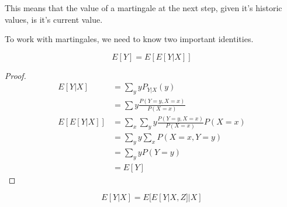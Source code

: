 \documentclass[12pt,letterpaper]{book}
\theoremstyle{definition}
\begin{document}
This means that the value of a martingale at the next step, given it's historic values, is it's current value.

To work with martingales, we need to know two important identities.
\begin{lemma}
  \[E[Y] = E[E[Y|X]]\] 
\end{lemma}
\begin{proof}
 \begin{align*}
   E[Y|X] &= \sum_y yP_{Y|X}(y)  \\
          &= \sum y \frac{P(Y=y, X=x)}{P(X=x)}\\
   E[E[Y|X]] &= \sum_x \sum_y y \frac{P(Y=y,X=x)}{P(X=x)} P(X=x) \\
             &= \sum_y y \sum_x P(X=x,Y=y) \\
             &= \sum_y y P(Y=y) \\
             &= E[Y]
 \end{align*} 
\end{proof}

\begin{lemma}
  \[E[Y|X] = E[E[Y|X,Z]|X]\] 
\end{lemma}
\end{document}
